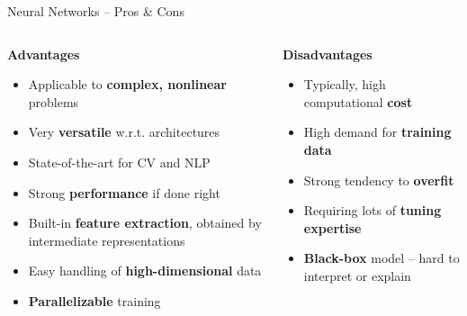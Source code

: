 \documentclass[11pt,compress,t,notes=noshow, xcolor=table]{beamer}
\newcommand{\highlight}[1]{\textcolor{hlcol}{\textbf{#1}}}
\newcommand{\positem}{\item[\textcolor{hlcol}{$\bm{+}$}]}
\newcommand{\negitem}{\item[\textcolor{hlcol}{$\bm{-}$}]}
\begin{document}
\begin{frame2}
  {Neural Networks -- Pros \& Cons}

\footnotesize

\begin{columns}[onlytextwidth]
  \begin{column}{0.5\textwidth}
    \highlight{Advantages}
    \footnotesize
    \begin{itemize}
      \positem Applicable to \textbf{complex, nonlinear} problems
      \positem Very \textbf{versatile} w.r.t. architectures
      \positem State-of-the-art for CV and NLP
      \positem Strong \textbf{performance} if done right
      \positem Built-in \textbf{feature extraction}, obtained by intermediate
      representations
      \positem Easy handling of \textbf{high-dimensional} data
      \positem \textbf{Parallelizable} training 
    \end{itemize}
  \end{column}

  \begin{column}{0.5\textwidth}
    \highlight{Disadvantages}
    \footnotesize
    \begin{itemize}
      \negitem Typically, high computational \textbf{cost}
      \negitem High demand for \textbf{training data} 
      \negitem Strong tendency to \textbf{overfit}
      \negitem Requiring lots of \textbf{tuning expertise} 
      \negitem \textbf{Black-box} model -- hard to interpret or explain
    \end{itemize}
  \end{column}
\end{columns}
\end{frame2}


\endlecture
\end{document}
